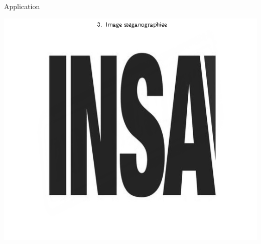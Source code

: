 \documentclass{beamer}
\begin{document}
\begin{frame}
\begin{exampleblock}{Application}
\begin{minipage}{.32\textwidth}
		{\centering{}}
		\label{fig2}
	\end{minipage}
	\begin{minipage}{.32\textwidth}\centering
		\includegraphics[scale=0.18]{images/fig3.png}
		{\centering{}}
		\label{fig3}
	\end{minipage}


\end{exampleblock}
\end{frame}
\end{document}
